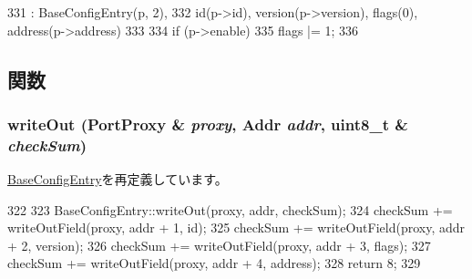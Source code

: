 \begin{DoxyCode}
331                                       : BaseConfigEntry(p, 2),
332     id(p->id), version(p->version), flags(0), address(p->address)
333 {
334     if (p->enable)
335         flags |= 1;
336 }
\end{DoxyCode}


\subsection{関数}
\hypertarget{classX86ISA_1_1IntelMP_1_1IOAPIC_a5fffc1006b1f28bd779d83ffbe213b4f}{
\subsubsection[{writeOut}]{ writeOut ({\bf PortProxy} \& {\em proxy}, \/  {\bf Addr} {\em addr}, \/  uint8\_\-t \& {\em checkSum})}}
\label{classX86ISA_1_1IntelMP_1_1IOAPIC_a5fffc1006b1f28bd779d83ffbe213b4f}


\hyperlink{classX86ISA_1_1IntelMP_1_1BaseConfigEntry_a5fffc1006b1f28bd779d83ffbe213b4f}{BaseConfigEntry}を再定義しています。


\begin{DoxyCode}
322 {
323     BaseConfigEntry::writeOut(proxy, addr, checkSum);
324     checkSum += writeOutField(proxy, addr + 1, id);
325     checkSum += writeOutField(proxy, addr + 2, version);
326     checkSum += writeOutField(proxy, addr + 3, flags);
327     checkSum += writeOutField(proxy, addr + 4, address);
328     return 8;
329 }
\end{DoxyCode}



